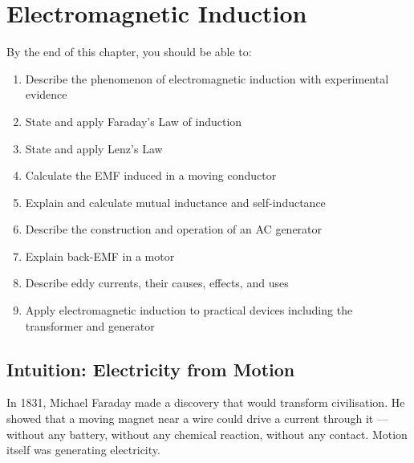 %

\chapter{Electromagnetic Induction}
\label{ch:em_induction}
\minitoc
\newpage


\begin{objectivebox}
By the end of this chapter, you should be able to:
\begin{enumerate}[noitemsep]
  \item Describe the phenomenon of electromagnetic
  induction with experimental evidence
  \item State and apply Faraday's Law of induction
  \item State and apply Lenz's Law
  \item Calculate the EMF induced in a moving
  conductor
  \item Explain and calculate mutual inductance
  and self-inductance
  \item Describe the construction and operation of
  an AC generator
  \item Explain back-EMF in a motor
  \item Describe eddy currents, their causes,
  effects, and uses
  \item Apply electromagnetic induction to practical
  devices including the transformer and generator
\end{enumerate}
\end{objectivebox}

\section{Intuition: Electricity from Motion}

In 1831, Michael Faraday made a discovery that would
transform civilisation. He showed that a moving magnet
near a wire could drive a current through it ---
without any battery, without any chemical reaction,
without any contact. Motion itself was generating
electricity.

